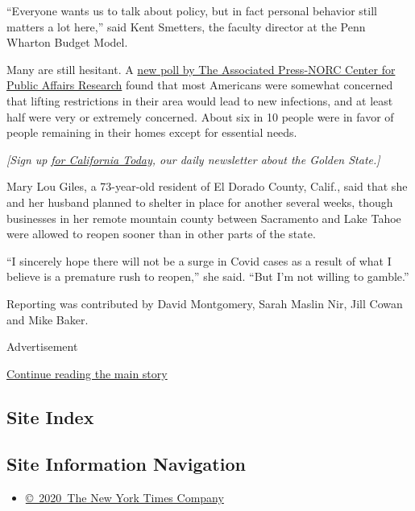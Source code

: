 ``Everyone wants us to talk about policy, but in fact personal behavior
still matters a lot here,'' said Kent Smetters, the faculty director at
the Penn Wharton Budget Model.

Many are still hesitant. A
\href{https://apnews.com/3562b5a082a27221e532075de509a36c}{new poll by
The Associated Press-NORC Center for Public Affairs Research} found that
most Americans were somewhat concerned that lifting restrictions in
their area would lead to new infections, and at least half were very or
extremely concerned. About six in 10 people were in favor of people
remaining in their homes except for essential needs.

\emph{{[}Sign up}
\href{https://www.nytimes3xbfgragh.onion/newsletters/california-today}{\emph{for
California Today}}\emph{, our daily newsletter about the Golden
State.{]}}

Mary Lou Giles, a 73-year-old resident of El Dorado County, Calif., said
that she and her husband planned to shelter in place for another several
weeks, though businesses in her remote mountain county between
Sacramento and Lake Tahoe were allowed to reopen sooner than in other
parts of the state.

``I sincerely hope there will not be a surge in Covid cases as a result
of what I believe is a premature rush to reopen,'' she said. ``But I'm
not willing to gamble.''

Reporting was contributed by David Montgomery, Sarah Maslin Nir, Jill
Cowan and Mike Baker.

Advertisement

\protect\hyperlink{after-bottom}{Continue reading the main story}

\hypertarget{site-index}{%
\subsection{Site Index}\label{site-index}}

\hypertarget{site-information-navigation}{%
\subsection{Site Information
Navigation}\label{site-information-navigation}}

\begin{itemize}
\tightlist
\item
  \href{https://help.nytimes3xbfgragh.onion/hc/en-us/articles/115014792127-Copyright-notice}{©~2020~The
  New York Times Company}
\end{itemize}

